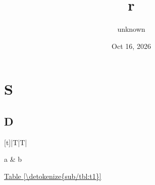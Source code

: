 \documentclass[letterpaper,10pt,english]{sphinxmanual}
\title{r}
\date{Oct 16, 2026}
\author{unknown}
\begin{document}
\pagestyle{empty}
\sphinxmaketitle
\pagestyle{plain}
\sphinxtableofcontents
\pagestyle{normal}
\label{\detokenize{index::doc}}



\chapter{S}
\label{\detokenize{sub/index:s}}\label{\detokenize{sub/index::doc}}

\section{D}
\label{\detokenize{sub/tbl:d}}\label{\detokenize{sub/tbl::doc}}

\begin{savenotes}\sphinxattablestart
\centering
{}
\sphinxthecaptionisattop
{}\label{\detokenize{sub/tbl:t1}}
\sphinxaftertopcaption
\begin{tabulary}{\linewidth}[t]{|T|T|}
\hline

a
&
b
\\
\hline
\end{tabulary}
\par
\sphinxattableend\end{savenotes}

\hyperref[\detokenize{sub/tbl:t1}]{Table \ref{\detokenize{sub/tbl:t1}}}



\renewcommand{\indexname}{Index}
\printindex
\end{document}
